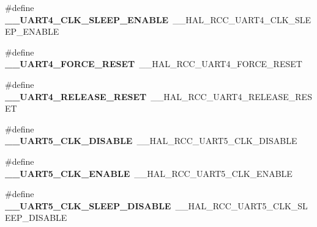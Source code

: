 \begin{DoxyCompactItemize}
\item 
\#define {\bfseries \+\_\+\+\_\+\+U\+A\+R\+T4\+\_\+\+C\+L\+K\+\_\+\+S\+L\+E\+E\+P\+\_\+\+E\+N\+A\+B\+LE}~\+\_\+\+\_\+\+H\+A\+L\+\_\+\+R\+C\+C\+\_\+\+U\+A\+R\+T4\+\_\+\+C\+L\+K\+\_\+\+S\+L\+E\+E\+P\+\_\+\+E\+N\+A\+B\+LE\hypertarget{group___h_a_l___r_c_c___aliased_ga4c3526cdbbac0bdd4c1b71ff91685d08}{}\label{group___h_a_l___r_c_c___aliased_ga4c3526cdbbac0bdd4c1b71ff91685d08}

\item 
\#define {\bfseries \+\_\+\+\_\+\+U\+A\+R\+T4\+\_\+\+F\+O\+R\+C\+E\+\_\+\+R\+E\+S\+ET}~\+\_\+\+\_\+\+H\+A\+L\+\_\+\+R\+C\+C\+\_\+\+U\+A\+R\+T4\+\_\+\+F\+O\+R\+C\+E\+\_\+\+R\+E\+S\+ET\hypertarget{group___h_a_l___r_c_c___aliased_ga3fa11393865d20cc6a9dd7a3bb49a7e8}{}\label{group___h_a_l___r_c_c___aliased_ga3fa11393865d20cc6a9dd7a3bb49a7e8}

\item 
\#define {\bfseries \+\_\+\+\_\+\+U\+A\+R\+T4\+\_\+\+R\+E\+L\+E\+A\+S\+E\+\_\+\+R\+E\+S\+ET}~\+\_\+\+\_\+\+H\+A\+L\+\_\+\+R\+C\+C\+\_\+\+U\+A\+R\+T4\+\_\+\+R\+E\+L\+E\+A\+S\+E\+\_\+\+R\+E\+S\+ET\hypertarget{group___h_a_l___r_c_c___aliased_ga0ba28f261c094e2f6df78da62042fb59}{}\label{group___h_a_l___r_c_c___aliased_ga0ba28f261c094e2f6df78da62042fb59}

\item 
\#define {\bfseries \+\_\+\+\_\+\+U\+A\+R\+T5\+\_\+\+C\+L\+K\+\_\+\+D\+I\+S\+A\+B\+LE}~\+\_\+\+\_\+\+H\+A\+L\+\_\+\+R\+C\+C\+\_\+\+U\+A\+R\+T5\+\_\+\+C\+L\+K\+\_\+\+D\+I\+S\+A\+B\+LE\hypertarget{group___h_a_l___r_c_c___aliased_gafe498a3d4cfc62755072abdb7b20b865}{}\label{group___h_a_l___r_c_c___aliased_gafe498a3d4cfc62755072abdb7b20b865}

\item 
\#define {\bfseries \+\_\+\+\_\+\+U\+A\+R\+T5\+\_\+\+C\+L\+K\+\_\+\+E\+N\+A\+B\+LE}~\+\_\+\+\_\+\+H\+A\+L\+\_\+\+R\+C\+C\+\_\+\+U\+A\+R\+T5\+\_\+\+C\+L\+K\+\_\+\+E\+N\+A\+B\+LE\hypertarget{group___h_a_l___r_c_c___aliased_ga7b4b49db3dac7e83c37beed3dfd19980}{}\label{group___h_a_l___r_c_c___aliased_ga7b4b49db3dac7e83c37beed3dfd19980}

\item 
\#define {\bfseries \+\_\+\+\_\+\+U\+A\+R\+T5\+\_\+\+C\+L\+K\+\_\+\+S\+L\+E\+E\+P\+\_\+\+D\+I\+S\+A\+B\+LE}~\+\_\+\+\_\+\+H\+A\+L\+\_\+\+R\+C\+C\+\_\+\+U\+A\+R\+T5\+\_\+\+C\+L\+K\+\_\+\+S\+L\+E\+E\+P\+\_\+\+D\+I\+S\+A\+B\+LE\hypertarget{group___h_a_l___r_c_c___aliased_ga82f8f6e08fbeea0ab37d22c5d02526ea}{}\label{group___h_a_l___r_c_c___aliased_ga82f8f6e08fbeea0ab37d22c5d02526ea}


\end{DoxyCompactItemize}
